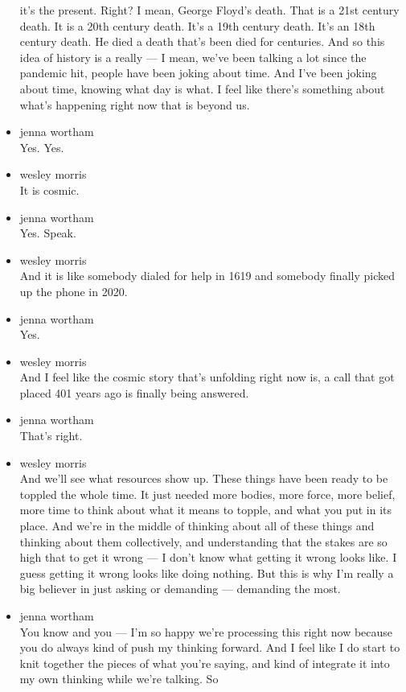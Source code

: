 \begin{itemize}
  it's the present. Right? I mean, George Floyd's death. That is a 21st
  century death. It is a 20th century death. It's a 19th century death.
  It's an 18th century death. He died a death that's been died for
  centuries. And so this idea of history is a really --- I mean, we've
  been talking a lot since the pandemic hit, people have been joking
  about time. And I've been joking about time, knowing what day is what.
  I feel like there's something about what's happening right now that is
  beyond us.
\item
  jenna wortham\\
  Yes. Yes.
\item
  wesley morris\\
  It is cosmic.
\item
  jenna wortham\\
  Yes. Speak.
\item
  wesley morris\\
  And it is like somebody dialed for help in 1619 and somebody finally
  picked up the phone in 2020.
\item
  jenna wortham\\
  Yes.
\item
  wesley morris\\
  And I feel like the cosmic story that's unfolding right now is, a call
  that got placed 401 years ago is finally being answered.
\item
  jenna wortham\\
  That's right.
\item
  wesley morris\\
  And we'll see what resources show up. These things have been ready to
  be toppled the whole time. It just needed more bodies, more force,
  more belief, more time to think about what it means to topple, and
  what you put in its place. And we're in the middle of thinking about
  all of these things and thinking about them collectively, and
  understanding that the stakes are so high that to get it wrong --- I
  don't know what getting it wrong looks like. I guess getting it wrong
  looks like doing nothing. But this is why I'm really a big believer in
  just asking or demanding --- demanding the most.
\item
  jenna wortham\\
  You know and you --- I'm so happy we're processing this right now
  because you do always kind of push my thinking forward. And I feel
  like I do start to knit together the pieces of what you're saying, and
  kind of integrate it into my own thinking while we're talking. So

\end{itemize}
